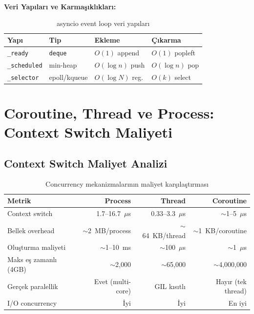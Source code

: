 \textbf{Veri Yap{\i}lar{\i} ve Karma\c{s}{\i}kl{\i}klar{\i}:}

\begin{table}[H]
\centering
\caption{asyncio event loop veri yap{\i}lar{\i}}
\label{tab:event-loop-ds}
\begin{tabularx}{\textwidth}{llXX}
\toprule
\color{chapterBlue}\textbf{Yap{\i}} & \color{chapterBlue}\textbf{Tip} & \color{chapterBlue}\textbf{Ekleme} & \color{chapterBlue}\textbf{\c{C}{\i}karma} \\
\midrule
\texttt{\_ready}     & \texttt{deque}    & $O(1)$ append     & $O(1)$ popleft \\
\texttt{\_scheduled} & min-heap          & $O(\log n)$ push  & $O(\log n)$ pop \\
\texttt{\_selector}  & epoll/kqueue      & $O(\log N)$ reg.  & $O(k)$ select \\
\bottomrule
\end{tabularx}
\end{table}


\section{Coroutine, Thread ve Process: Context Switch Maliyeti}
\label{sec:context-switch}

\subsection{Context Switch Maliyet Analizi}
\label{sec:context-switch-cost}

\begin{table}[H]
\centering
\caption{Concurrency mekanizmalar{\i}n{\i}n maliyet kar\c{s}{\i}la\c{s}t{\i}rmas{\i}}
\label{tab:context-switch}
\begin{tabularx}{\textwidth}{Xrrr}
\toprule
\color{chapterBlue}\textbf{Metrik} & \color{chapterBlue}\textbf{Process} & \color{chapterBlue}\textbf{Thread} & \color{chapterBlue}\textbf{Coroutine} \\
\midrule
Context switch        & 1.7--16.7~$\mu$s   & 0.33--3.3~$\mu$s  & $\sim$1--5~$\mu$s \\
Bellek overhead       & $\sim$2~MB/process  & $\sim$64~KB/thread & $\sim$1~KB/coroutine \\
Olu\c{s}turma maliyeti   & $\sim$1--10~ms      & $\sim$100~$\mu$s   & $\sim$1~$\mu$s \\
Maks e\c{s} zamanl{\i} (4GB)& $\sim$2{,}000        & $\sim$65{,}000      & $\sim$4{,}000{,}000 \\
Ger\c{c}ek paralellik    & Evet (multi-core) & GIL k{\i}s{\i}tl{\i}       & Hay{\i}r (tek thread) \\
I/O concurrency       & \.{I}yi             & \.{I}yi             & En iyi \\
\bottomrule
\end{tabularx}
\end{table}

